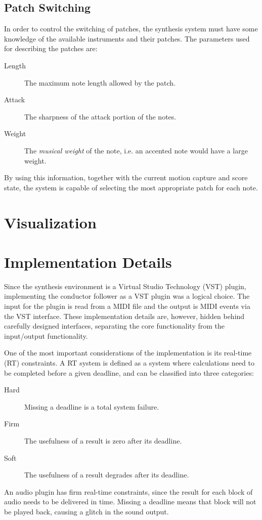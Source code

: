 \section{Patch Switching}
\label{sec:patch_switching}

In order to control the switching of patches,
the synthesis system must have some knowledge of
the available instruments and their patches.
The parameters used for describing the patches are:
\begin{description}
\item[Length] The maximum note length allowed by the patch.
\item[Attack] The sharpness of the attack portion of the notes.
\item[Weight] The \textit{musical weight} of the note, i.e. an accented note would have a large weight.
\end{description}
By using this information,
together with the current motion capture and score state,
the system is capable of selecting
the most appropriate patch for each note.


\chapter{Visualization}
\label{chapter:visualization}

\chapter{Implementation Details}
\label{chapter:implementation_details}

Since the synthesis environment is a
Virtual Studio Technology (VST) plugin,
implementing the conductor follower as a VST plugin was a logical choice.
The input for the plugin is read from a MIDI file
and the output is MIDI events via the VST interface.
These implementation details are, however, hidden behind
carefully designed interfaces,
separating the core functionality from the input/output functionality.

One of the most important considerations of the implementation
is its real-time (RT) constraints.
A RT system is defined as a system where calculations
need to be completed before a given deadline,
and can be classified into three categories:
\begin{description}
\item[Hard]
Missing a deadline is a total system failure.
\item[Firm]
The usefulness of a result is zero after its deadline.
\item[Soft]
The usefulness of a result degrades after its deadline.
\end{description}
An audio plugin has firm real-time constraints,
since the result for each block of audio needs to be delivered in time.
Missing a deadline means that block will not be played back,
causing a glitch in the sound output.

